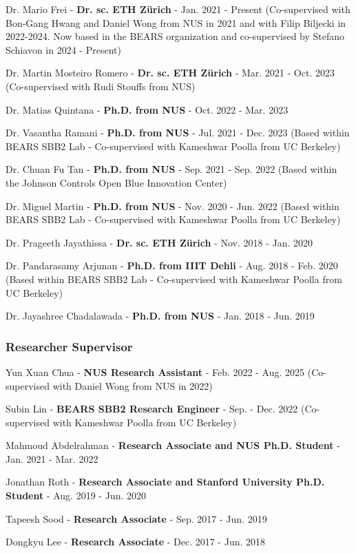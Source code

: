 \documentclass[10pt,a4paper]{article}
\begin{document}
\begin{small}
\begin{etaremune}
\item 
Dr. Mario Frei - \textbf{Dr. sc. ETH Z\"urich} - Jan. 2021 - Present (Co-supervised with Bon-Gang Hwang and Daniel Wong from NUS in 2021 and with Filip Biljecki in 2022-2024. Now based in the BEARS organization and co-supervised by Stefano Schiavon in 2024 - Present)
\item 
Dr. Martin Mosteiro Romero - \textbf{Dr. sc. ETH Z\"urich} - Mar. 2021 - Oct. 2023 (Co-supervised with Rudi Stouffs from NUS)
\item
Dr. Matias Quintana - \textbf{Ph.D. from NUS} - Oct. 2022 - Mar. 2023 
\item
Dr. Vasantha Ramani - \textbf{Ph.D. from NUS} - Jul. 2021 - Dec. 2023 (Based within BEARS SBB2 Lab - Co-supervised with Kameshwar Poolla from UC Berkeley)
\item
Dr. Chuan Fu Tan - \textbf{Ph.D. from NUS} - Sep. 2021 - Sep. 2022 (Based within the Johnson Controls Open Blue Innovation Center)
\item  
Dr. Miguel Martin - \textbf{Ph.D. from NUS} - Nov. 2020 - Jun. 2022 (Based within BEARS SBB2 Lab - Co-supervised with Kameshwar Poolla from UC Berkeley)
\item 
Dr. Prageeth Jayathissa - \textbf{Dr. sc. ETH Z\"urich} - Nov. 2018 - Jan. 2020
\item
Dr. Pandarasamy Arjunan - \textbf{Ph.D. from IIIT Dehli} - Aug. 2018 - Feb. 2020 (Based within BEARS SBB2 Lab - Co-supervised with Kameshwar Poolla from UC Berkeley)
\item 
Dr. Jayashree Chadalawada - \textbf{Ph.D. from NUS} - Jan. 2018 - Jun. 2019 
\end{etaremune}

\subsubsection*{Researcher Supervisor}
\begin{etaremune}
\item
Yun Xuan Chua - \textbf{NUS Research Assistant} - Feb. 2022 - Aug. 2025 (Co-supervised with Daniel Wong from NUS in 2022)
\item
Subin Lin - \textbf{BEARS SBB2 Research Engineer} - Sep. - Dec. 2022 (Co-supervised with Kameshwar Poolla from UC Berkeley)
\item 
Mahmoud Abdelrahman - \textbf{Research Associate and NUS Ph.D. Student} - Jan. 2021  - Mar. 2022
\item 
Jonathan Roth - \textbf{Research Associate and Stanford University Ph.D. Student} - Aug. 2019  - Jun. 2020
\item 
Tapeesh Sood - \textbf{Research Associate} - Sep. 2017 - Jun. 2019
\item 
Dongkyu Lee - \textbf{Research Associate} - Dec. 2017 - Jun. 2018
\end{etaremune}


\end{small}
\end{document}
